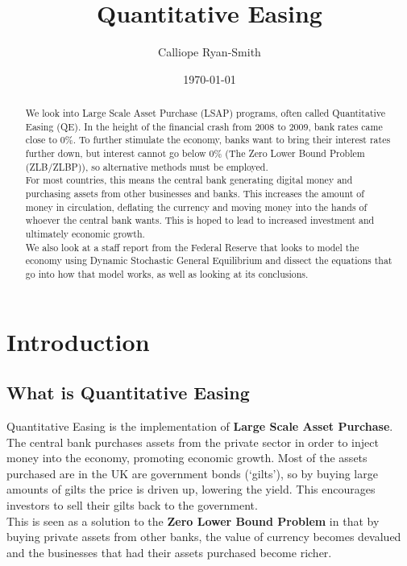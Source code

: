 \documentclass[notitlepage,12pt]{report}
\title{Quantitative Easing}
\author{Calliope Ryan-Smith}
\date{\isodate\today}
\begin{document}
\begin{titlingpage}


\maketitle{}

\begin{abstract}
	We look into Large Scale Asset Purchase (LSAP) programs, often called Quantitative Easing (QE). In the height of the financial crash from 2008 to 2009, bank rates came close to 0\%. To further stimulate the economy, banks want to bring their interest rates further down, but interest cannot go below 0\% (The Zero Lower Bound Problem (ZLB/ZLBP)), so alternative methods must be employed.\\
	For most countries, this means the central bank generating digital money and purchasing assets from other businesses and banks. This increases the amount of money in circulation, deflating the currency and moving money into the hands of whoever the central bank wants. This is hoped to lead to increased investment and ultimately economic growth.\\
	We also look at a staff report from the Federal Reserve that looks to model the economy using Dynamic Stochastic General Equilibrium and dissect the equations that go into how that model works, as well as looking at its conclusions.
\end{abstract}

\end{titlingpage}

\tableofcontents

\setcounter{chapter}{-1}

\chapter{Introduction}

\section{What is Quantitative Easing}

Quantitative Easing is the implementation of {\bf Large Scale Asset Purchase}. The central bank purchases assets from the private sector in order to inject money into the economy, promoting economic growth. Most of the assets purchased are in the UK are government bonds (`gilts'), so by buying large amounts of gilts the price is driven up, lowering the yield. This encourages investors to sell their gilts back to the government.\\
This is seen as a solution to the {\bf Zero Lower Bound Problem} in that by buying private assets from other banks, the value of currency becomes devalued and the businesses that had their assets purchased become richer.
\end{document}
